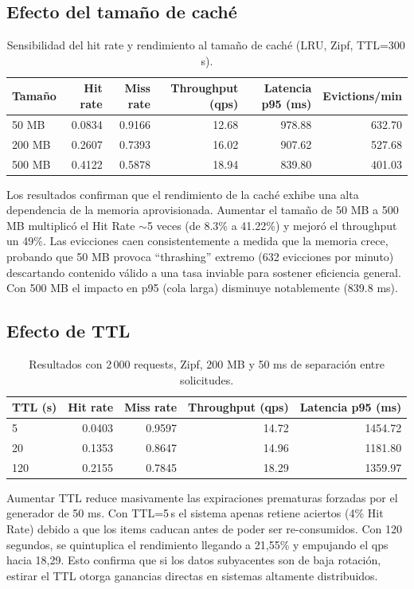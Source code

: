 \documentclass[letter,12pt]{article}
\begin{document}
\subsection{Efecto del tamaño de caché}
\begin{table}[H]
\centering
\begin{tabular}{lrrrrr}
\toprule
Tamaño & Hit rate & Miss rate & Throughput (qps) & Latencia p95 (ms) & Evictions/min \\
\midrule
50 MB & 0.0834 & 0.9166 & 12.68 & 978.88 & 632.70 \\
200 MB & 0.2607 & 0.7393 & 16.02 & 907.62 & 527.68 \\
500 MB & 0.4122 & 0.5878 & 18.94 & 839.80 & 401.03 \\
\bottomrule
\end{tabular}
\caption{Sensibilidad del hit rate y rendimiento al tamaño de caché (LRU, Zipf, TTL=300\,s).}
\end{table}

Los resultados confirman que el rendimiento de la caché exhibe una alta dependencia de la memoria aprovisionada. Aumentar el tamaño de 50 MB a 500 MB multiplicó el Hit Rate $\sim$5 veces (de 8.3\% a 41.22\%) y mejoró el throughput un 49\%. Las evicciones caen consistentemente a medida que la memoria crece, probando que 50 MB provoca ``thrashing'' extremo (632 evicciones por minuto) descartando contenido válido a una tasa inviable para sostener eficiencia general. Con 500 MB el impacto en p95 (cola larga) disminuye notablemente (839.8 ms).

\subsection{Efecto de TTL}
\begin{table}[H]
\centering
\begin{tabular}{lrrrr}
\toprule
TTL (s) & Hit rate & Miss rate & Throughput (qps) & Latencia p95 (ms) \\
\midrule
5 & 0.0403 & 0.9597 & 14.72 & 1454.72 \\
20 & 0.1353 & 0.8647 & 14.96 & 1181.80 \\
120 & 0.2155 & 0.7845 & 18.29 & 1359.97 \\
\bottomrule
\end{tabular}
\caption{Resultados con 2\,000 requests, Zipf, 200 MB y 50 ms de separación entre solicitudes.}
\end{table}

Aumentar TTL reduce masivamente las expiraciones prematuras forzadas por el generador de 50 ms. Con TTL=5\,s el sistema apenas retiene aciertos (4\% Hit Rate) debido a que los items caducan antes de poder ser re-consumidos. Con 120 segundos, se quintuplica el rendimiento llegando a 21,55\% y empujando el qps hacia 18,29. Esto confirma que si los datos subyacentes son de baja rotación, estirar el TTL otorga ganancias directas en sistemas altamente distribuidos.
\end{document}
